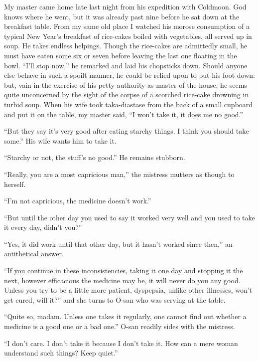 \documentclass[12pt, openright]{book}
\begin{document}
My master came home late last night from his expedition with Coldmoon.
God knows where he went, but it was already past nine before he sat down
at the breakfast table. From my same old place I watched his morose
consumption of a typical New Year's breakfast of rice-cakes boiled with
vegetables, all served up in soup. He takes endless helpings. Though the
rice-cakes are admittedly small, he must have eaten some six or seven
before leaving the last one floating in the bowl. ``I'll stop now,'' he
remarked and laid his chopsticks down. Should anyone else behave in such
a spoilt manner, he could be relied upon to put his foot down: but, vain
in the exercise of his petty authority as master of the house, he seems
quite unconcerned by the sight of the corpse of a scorched rice-cake
drowning in turbid soup. When his wife took taka-diastase from the back
of a small cupboard and put it on the table, my master said, ``I won't
take it, it does me no good.''

``But they say it's very good after eating starchy things. I think you
should take some.'' His wife wants him to take it.

``Starchy or not, the stuff's no good.'' He remains stubborn.

``Really, you are a most capricious man,'' the mistress mutters as
though to herself.

``I'm not capricious, the medicine doesn't work.''

``But until the other day you used to say it worked very well and you
used to take it every day, didn't you?''

``Yes, it did work until that other day, but it hasn't worked since
then,'' an antithetical answer.

``If you continue in these inconsistencies, taking it one day and
stopping it the next, however efficacious the medicine may be, it will
never do you any good. Unless you try to be a little more patient,
dyspepsia, unlike other illnesses, won't get cured, will it?'' and she
turns to O-san who was serving at the table.

``Quite so, madam. Unless one takes it regularly, one cannot find out
whether a medicine is a good one or a bad one.'' O-san readily sides
with the mistress.

``I don't care. I don't take it because I don't take it. How can a mere
woman understand such things? Keep quiet.''
\end{document}
